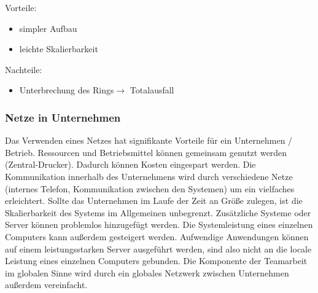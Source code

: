 \documentclass[12pt,a4paper]{article}
\begin{document}
\begin{minipage}[t]{.48\textwidth}
\begin{flushright}
        \end{flushright}
        \footnotesize Vorteile:
        \begin{itemize}
            \footnotesize
            \item simpler Aufbau
            \item leichte Skalierbarkeit
            \end{itemize}
            \footnotesize Nachteile:
            \begin{itemize}
                \footnotesize
                \item Unterbrechung des Rings\newline $\longrightarrow$ Totalausfall
                \end{itemize}
	\end{minipage}

\subsubsection{Netze in Unternehmen}
    Das Verwenden eines Netzes hat signifikante Vorteile für ein Unternehmen / Betrieb. Ressourcen und Betriebsmittel können gemeinsam genutzt werden (Zentral-Drucker). Dadurch können Kosten eingespart werden. Die Kommunikation innerhalb des Unternehmens wird durch verschiedene Netze (internes Telefon, Kommunikation zwischen den Systemen) um ein vielfaches erleichtert. Sollte das Unternehmen im Laufe der Zeit an Größe zulegen, ist die Skalierbarkeit des Systems im Allgemeinen unbegrenzt. Zusätzliche Systeme oder Server können problemlos hinzugefügt werden. Die Systemleistung eines einzelnen Computers kann außerdem gesteigert werden. Aufwendige Anwendungen können auf einem leistungsstarken Server ausgeführt werden, sind also nicht an die locale Leistung eines einzelnen Computers gebunden. Die Komponente der Teamarbeit im globalen Sinne wird durch ein globales Netzwerk zwischen Unternehmen außerdem vereinfacht.
\end{document}
